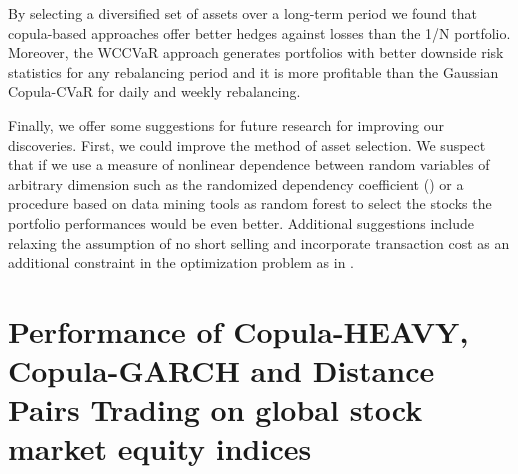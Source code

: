 \documentclass[a4paper,12pt]{report}
\begin{document}
\begin{refsection}
By selecting a diversified set of assets over a long-term period we found that copula-based approaches offer better hedges against losses than the 1/N portfolio. Moreover, the WCCVaR approach generates portfolios with better downside risk statistics for any rebalancing period and it is more profitable than the Gaussian Copula-CVaR for daily and weekly rebalancing.

Finally, we offer some suggestions for future research for improving our discoveries. First, we could improve the method of asset selection. We suspect that if we use a measure of nonlinear dependence between random variables of arbitrary dimension such as the randomized dependency coefficient (\citet*{lopez2013randomized}) or a procedure based on data mining tools as random forest \citet*{dlrz10} to select the stocks the portfolio performances would be even better. 
Additional suggestions include relaxing the assumption of no short selling and incorporate transaction cost as an additional constraint in the optimization problem as in \citet*{krokhmal2002}.

%
%
\printbibliography[title={REFERENCES}]
\end{refsection}
\newpage


\chapter{Performance of Copula-HEAVY, Copula-GARCH and Distance Pairs Trading on global stock market equity indices}
\thispagestyle{myheadings}
\markright{}


\pagestyle{myheadings}
\markright{}

\end{document}
